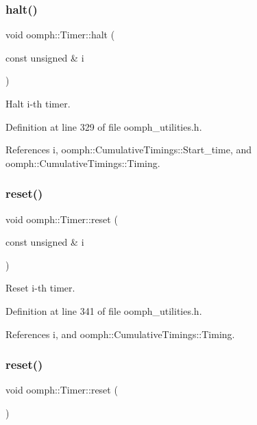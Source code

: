 \subsubsection{\texorpdfstring{halt()}{halt()}}
{\footnotesize\ttfamily void oomph\+::\+Timer\+::halt (\begin{DoxyParamCaption}\item[{const unsigned \&}]{i }\end{DoxyParamCaption})\hspace{0.3cm}{\ttfamily [inline]}}



Halt i-\/th timer. 



Definition at line 329 of file oomph\+\_\+utilities.\+h.



References i, oomph\+::\+Cumulative\+Timings\+::\+Start\+\_\+time, and oomph\+::\+Cumulative\+Timings\+::\+Timing.

\mbox{\label{classoomph_1_1Timer_ad2980c89ce68bb41d42328e72ce96db4}} 
\subsubsection{\texorpdfstring{reset()}{reset()}\hspace{0.1cm}{\footnotesize\ttfamily [1/2]}}
{\footnotesize\ttfamily void oomph\+::\+Timer\+::reset (\begin{DoxyParamCaption}\item[{const unsigned \&}]{i }\end{DoxyParamCaption})\hspace{0.3cm}{\ttfamily [inline]}}



Reset i-\/th timer. 



Definition at line 341 of file oomph\+\_\+utilities.\+h.



References i, and oomph\+::\+Cumulative\+Timings\+::\+Timing.

\mbox{\label{classoomph_1_1Timer_aed19397ab3c3d4449cbc3119b854fbda}} 
\subsubsection{\texorpdfstring{reset()}{reset()}\hspace{0.1cm}{\footnotesize\ttfamily [2/2]}}
{\footnotesize\ttfamily void oomph\+::\+Timer\+::reset (\begin{DoxyParamCaption}{ }\end{DoxyParamCaption})\hspace{0.3cm}{\ttfamily [inline]}}



